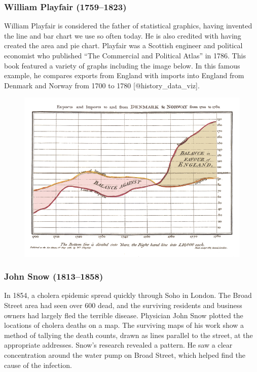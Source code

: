 \documentclass[]{book}
\theoremstyle{definition}
\theoremstyle{definition}
\theoremstyle{definition}
\theoremstyle{remark}
\begin{document}
\subsubsection{William Playfair
(1759--1823)}\label{william-playfair-17591823}

William Playfair is considered the father of statistical graphics,
having invented the line and bar chart we use so often today. He is also
credited with having created the area and pie chart. Playfair was a
Scottish engineer and political economist who published ``The Commercial
and Political Atlas'' in 1786. This book featured a variety of graphs
including the image below. In this famous example, he compares exports
from England with imports into England from Denmark and Norway from 1700
to 1780 {[}@history\_data\_viz{]}.

\begin{figure}
\centering
\includegraphics{images/Playfair.png}
\caption{}
\end{figure}

\subsubsection{John Snow (1813--1858)}\label{john-snow-18131858}

In 1854, a cholera epidemic spread quickly through Soho in London. The
Broad Street area had seen over 600 dead, and the surviving residents
and business owners had largely fled the terrible disease. Physician
John Snow plotted the locations of cholera deaths on a map. The
surviving maps of his work show a method of tallying the death counts,
drawn as lines parallel to the street, at the appropriate addresses.
Snow's research revealed a pattern. He saw a clear concentration around
the water pump on Broad Street, which helped find the cause of the
infection.
\end{document}
